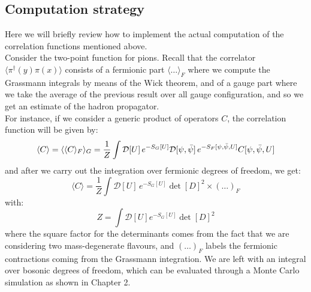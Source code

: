 \subsection{Computation strategy}
Here we will briefly review how to implement the actual computation of the correlation functions mentioned above.
\\ Consider the two-point function for pions. Recall that the correlator $\langle \pi^\dagger(y) \pi(x) \rangle$ consists of a fermionic part $\langle \dots \rangle_F$ where we compute the Grassmann integrals by means of the Wick theorem, and of a gauge part where we take the average of the previous result over all gauge configuration, and so we get an estimate of the hadron propagator.
\\ For instance, if we consider a generic product of operators $C$, the correlation function will be given by:
\begin{equation}
\langle C \rangle = \langle \langle C \rangle_F \rangle_G = \frac{1}{Z} \int \mathcal{D}[U] \, e^{-S_G[U]} \mathcal{D}[\psi, \Bar{\psi}] \, e^{-S_F[{\psi, \Bar{\psi}, U]}} C[\psi, \Bar{\psi}, U]
\end{equation}
and after we carry out the integration over fermionic degrees of freedom, we get:
\begin{equation}
    \langle C \rangle = \frac{1}{Z} \int \mathcal{D}[U] \, e^{-S_G[U]} \det[D]^2 \times (\dots)_F
\end{equation}
with:
\begin{equation}
    Z = \int \mathcal{D}[U]e^{-S_G[U]} \det[D]^2
\end{equation}
where the square factor for the determinants comes from the fact that we are considering two mass-degenerate flavours, and $(\dots)_F$ labels the fermionic contractions coming from the Grassmann integration. We are left with an integral over bosonic degrees of freedom, which can be evaluated through a Monte Carlo simulation as shown in Chapter 2.
